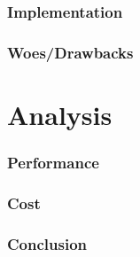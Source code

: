 \documentclass[12pt, letterpaper]{article}
\begin{document}
\subsubsection{Implementation}

\subsubsection{Woes/Drawbacks}

\section{Analysis}
\subsubsection{Performance}
\subsubsection{Cost}
\subsubsection{Conclusion}
\end{document}
